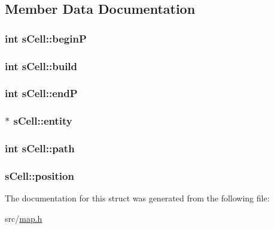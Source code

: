 \subsection{Member Data Documentation}
\hypertarget{structs_cell_a40488db19acb0a9d5ff33882a46a1303}{
\subsubsection[{begin\-P}]{\setlength{\rightskip}{0pt plus 5cm}int s\-Cell\-::begin\-P}}\label{structs_cell_a40488db19acb0a9d5ff33882a46a1303}
\hypertarget{structs_cell_a97b34abb3010bf4ec10aa5f7c6400cef}{
\subsubsection[{build}]{\setlength{\rightskip}{0pt plus 5cm}int s\-Cell\-::build}}\label{structs_cell_a97b34abb3010bf4ec10aa5f7c6400cef}
\hypertarget{structs_cell_a6ec923340fb62915663be3fb0015f3cd}{
\subsubsection[{end\-P}]{\setlength{\rightskip}{0pt plus 5cm}int s\-Cell\-::end\-P}}\label{structs_cell_a6ec923340fb62915663be3fb0015f3cd}
\hypertarget{structs_cell_a9304c71735ad125198fc7bb3070e7bc4}{
\subsubsection[{entity}]{$\ast$ s\-Cell\-::entity}}\label{structs_cell_a9304c71735ad125198fc7bb3070e7bc4}
\hypertarget{structs_cell_a03358119a2ac874f7d85b94d7b651a6c}{
\subsubsection[{path}]{\setlength{\rightskip}{0pt plus 5cm}int s\-Cell\-::path}}\label{structs_cell_a03358119a2ac874f7d85b94d7b651a6c}
\hypertarget{structs_cell_a7b1e23f03b64816ca088b2f63082975b}{
\subsubsection[{position}]{ s\-Cell\-::position}}\label{structs_cell_a7b1e23f03b64816ca088b2f63082975b}


The documentation for this struct was generated from the following file\-:\begin{DoxyCompactItemize}
\item 
src/\hyperlink{map_8h}{map.\-h}\end{DoxyCompactItemize}
